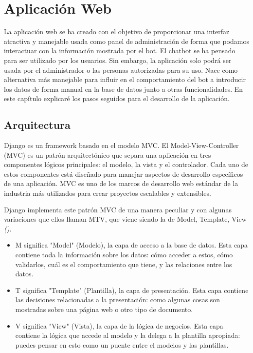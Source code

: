 \chapter{Aplicación Web}

La aplicación web se ha creado con el objetivo de proporcionar una interfaz atractiva y manejable usada como panel de administración de forma que podamos interactuar con la información mostrada por el bot. El chatbot se ha pensado para ser utilizado por los usuarios. Sin embargo, la aplicación solo podrá ser usada por el administrador o las personas autorizadas para su uso. Nace como alternativa más manejable para influir en el comportamiento del bot a introducir los datos de forma manual en la base de datos junto a otras funcionalidades. En este capítulo explicaré los pasos seguidos para el desarrollo de la aplicación. \vspace{0.3cm}


\section{Arquitectura} 


Django es un framework basado en el modelo  MVC. El Model-View-Controller (MVC) es un patrón arquitectónico que separa una aplicación en tres componentes lógicos principales: el modelo, la vista y el controlador. Cada uno de estos componentes está diseñado para manejar aspectos de desarrollo específicos de una aplicación. MVC es uno de los marcos de desarrollo web estándar de la industria más utilizados para crear proyectos escalables y extensibles.

Django implementa este patrón MVC de una manera peculiar y con algunas variaciones que ellos llaman MTV, que viene siendo la de Model, Template, View \textit{(\cite{djangomvt})}.

\begin{itemize}

\item M significa "Model" (Modelo), la capa de acceso a la base de datos. Esta capa contiene toda la información sobre los datos: cómo acceder a estos, cómo validarlos, cuál es el comportamiento que tiene, y las relaciones entre los datos.

\item T significa "Template" (Plantilla), la capa de presentación. Esta capa contiene las decisiones relacionadas a la presentación: como algunas cosas son mostradas sobre una página web o otro tipo de documento.

\item V significa "View" (Vista), la capa de la lógica de negocios. Esta capa contiene la lógica que accede al modelo y la delega a la plantilla apropiada: puedes pensar en esto como un puente entre el modelos y las plantillas.

\end{itemize}

